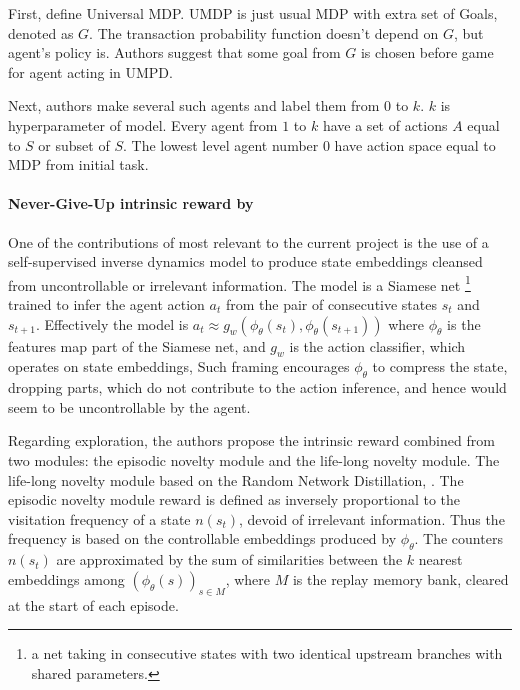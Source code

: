 \documentclass[acmsmall, nonacm]{acmart}
\begin{document}
First, define Universal MDP. UMDP is just usual MDP with extra set of Goals, denoted as $G$. The transaction probability function doesn't depend on $G$, but agent's policy is. Authors suggest that some goal from $G$ is chosen before game for agent acting in UMPD.

Next, authors make several such agents and label them from $0$ to $k$. $k$ is hyperparameter of model. Every agent from $1$ to $k$ have a set of actions $A$ equal to $S$ or subset of $S$. The lowest level agent number $0$ have action space equal to MDP from initial task.


\paragraph{Never-Give-Up intrinsic reward by~\citet{badia_never_2020}} %
\label{par:never_give_up}

One of the contributions of most relevant to the current project is the use of a self-supervised inverse dynamics model to produce state embeddings cleansed from uncontrollable or irrelevant information.
%
The model is a Siamese net%
\footnote{
    a net taking in consecutive states with two identical upstream branches with shared parameters.
}
trained to infer the agent action $a_t$ from the pair of consecutive states $s_t$ and $s_{t+1}$. Effectively the model is $
    a_t \approx g_w(\phi_\theta(s_t), \phi_\theta(s_{t+1}))
$ where $\phi_\theta$ is the features map part of the Siamese net, and $g_w$ is the action classifier, which operates on state embeddings, Such framing encourages $\phi_\theta$ to compress the state, dropping parts, which do not contribute to the action inference, and hence would seem to be uncontrollable by the agent.

Regarding exploration, the authors propose the intrinsic reward combined from two modules: the episodic novelty module and the life-long novelty module.
%
The life-long novelty module based on the Random Network Distillation, \citep{burda_exploration_2019}.
%
The episodic novelty module reward is defined as inversely proportional to the visitation frequency of a state $n(s_t)$, devoid of irrelevant information. Thus the frequency is based on the controllable embeddings produced by $\phi_\theta$.
The counters $n(s_t)$ are approximated by the sum of similarities between the $k$ nearest embeddings among  $(\phi_\theta(s))_{s\in M}$, where $M$ is the replay memory bank, cleared at the start of each episode.
\end{document}
